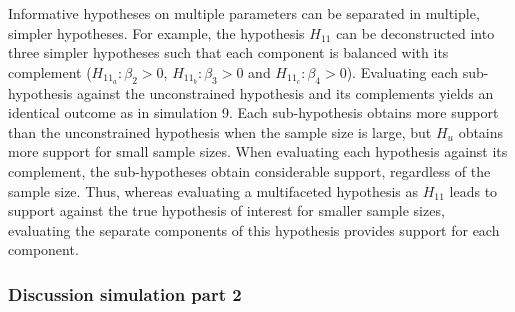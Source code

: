 \documentclass[
]{interact}
\begin{document}
                    Informative hypotheses on multiple parameters can be separated in
                    multiple, simpler hypotheses. For example, the hypothesis \(H_{11}\) can
                    be deconstructed into three simpler hypotheses such that each component
                    is balanced with its complement (\(H_{11_a}: \beta_2 > 0\),
                                                     \(H_{11_b}: \beta_3 > 0\) and \(H_{11_c}: \beta_4 > 0\)). Evaluating
                    each sub-hypothesis against the unconstrained hypothesis and its
                    complements yields an identical outcome as in simulation 9. Each
                    sub-hypothesis obtains more support than the unconstrained hypothesis
                    when the sample size is large, but \(H_u\) obtains more support for
                    small sample sizes. When evaluating each hypothesis against its
                    complement, the sub-hypotheses obtain considerable support, regardless
                    of the sample size. Thus, whereas evaluating a multifaceted hypothesis
                    as \(H_{11}\) leads to support against the true hypothesis of interest
                    for smaller sample sizes, evaluating the separate components of this
                    hypothesis provides support for each component.
                    
                    \hypertarget{discussion-simulation-part-2}{%
                      \subsubsection{Discussion simulation part
                        2}\label{discussion-simulation-part-2}}
                    
\end{document}
